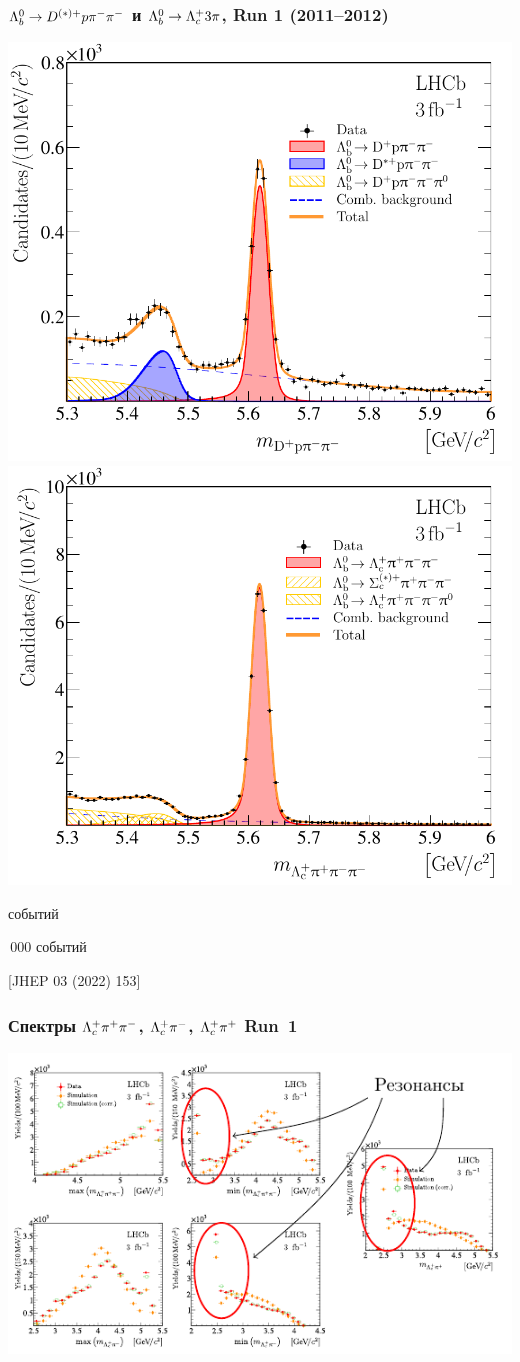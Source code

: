 \documentclass[10pt]{beamer}
\begin{document}
\begin{frame}[label=old-ana]%
  \frametitle{${\Lambda_b^0}\to{D^{(*)+}}{p}{\pi^-}{\pi^-}$ и ${\Lambda_b^0}\to{\Lambda_c^+}3\pi$, Run 1 (2011--2012)}
  \centering
  \includegraphics[width=.49\linewidth]{figures/fit-dppipi-run1}
  \includegraphics[width=.49\linewidth]{figures/fit-lc3pi-run1}
  \vfill
  \parbox{.49\linewidth}{ событий}
  \parbox{.49\linewidth}{\,000 событий}
  \vfill \vfill
  [JHEP 03 (2022) 153]
\end{frame}%

\begin{frame}[label=reweighting-spectra]%
  \frametitle{Спектры ${\Lambda_c^+}{\pi^+}{\pi^-}$, ${\Lambda_c^+}{\pi^-}$, ${\Lambda_c^+}{\pi^+}$ Run~1}
  \includegraphics[width=\linewidth]{figures/reweighting-resonances}
  \\ \vfill \centering [JHEP 03 (2022) 153]
\end{frame}%
\end{document}
